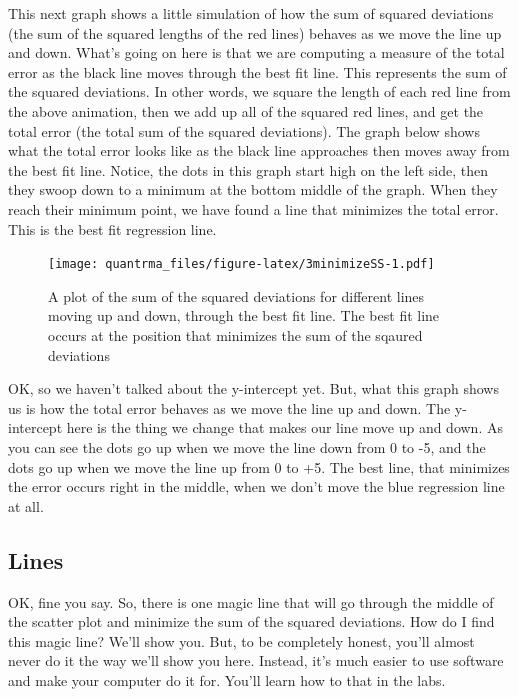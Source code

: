 \documentclass[
]{book}
\begin{document}
This next graph shows a little simulation of how the sum of squared deviations (the sum of the squared lengths of the red lines) behaves as we move the line up and down. What's going on here is that we are computing a measure of the total error as the black line moves through the best fit line. This represents the sum of the squared deviations. In other words, we square the length of each red line from the above animation, then we add up all of the squared red lines, and get the total error (the total sum of the squared deviations). The graph below shows what the total error looks like as the black line approaches then moves away from the best fit line. Notice, the dots in this graph start high on the left side, then they swoop down to a minimum at the bottom middle of the graph. When they reach their minimum point, we have found a line that minimizes the total error. This is the best fit regression line.

\begin{figure}
\centering
\texttt{[image: quantrma\_files/figure-latex/3minimizeSS-1.pdf]}
\caption{\label{fig:3minimizeSS}A plot of the sum of the squared deviations for different lines moving up and down, through the best fit line. The best fit line occurs at the position that minimizes the sum of the sqaured deviations}
\end{figure}

OK, so we haven't talked about the y-intercept yet. But, what this graph shows us is how the total error behaves as we move the line up and down. The y-intercept here is the thing we change that makes our line move up and down. As you can see the dots go up when we move the line down from 0 to -5, and the dots go up when we move the line up from 0 to +5. The best line, that minimizes the error occurs right in the middle, when we don't move the blue regression line at all.

\hypertarget{lines}{%
\subsection{Lines}\label{lines}}

OK, fine you say. So, there is one magic line that will go through the middle of the scatter plot and minimize the sum of the squared deviations. How do I find this magic line? We'll show you. But, to be completely honest, you'll almost never do it the way we'll show you here. Instead, it's much easier to use software and make your computer do it for. You'll learn how to that in the labs.
\end{document}
